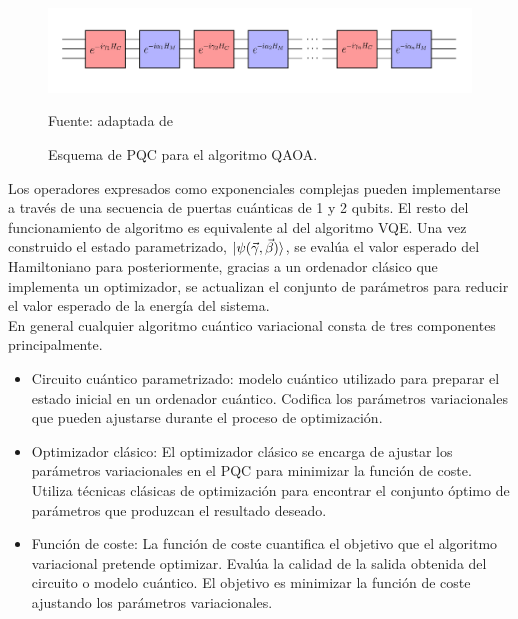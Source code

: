 \begin{figure}[!ht]
    \centering
    \includegraphics[scale = 0.4]{img/03-qaoa_layers.png}
    \caption{Esquema de PQC para el algoritmo QAOA.}
    Fuente: adaptada de \citep{jack}
    \label{fig:qaoa_layers}
\end{figure}

Los operadores expresados como exponenciales complejas pueden implementarse a través de una secuencia de puertas cuánticas de 1 y 2 qubits. El resto del funcionamiento de algoritmo es equivalente al del algoritmo VQE. Una vez construido el estado parametrizado, $\ket{\psi(\Vec{\gamma}, \Vec{\beta})}$, se evalúa el valor esperado del Hamiltoniano para posteriormente, gracias a un ordenador clásico que implementa un optimizador, se actualizan el conjunto de parámetros para reducir el valor esperado de la energía del sistema. \\

En general cualquier algoritmo cuántico variacional consta de tres componentes principalmente. 

\begin{itemize}
    
    \item Circuito cuántico parametrizado: modelo cuántico utilizado para preparar el estado inicial en un ordenador cuántico. Codifica los parámetros variacionales que pueden ajustarse durante el proceso de optimización.

    \item Optimizador clásico: El optimizador clásico se encarga de ajustar los parámetros variacionales en el PQC para minimizar la función de coste. Utiliza técnicas clásicas de optimización para encontrar el conjunto óptimo de parámetros que produzcan el resultado deseado.

    \item Función de coste: La función de coste cuantifica el objetivo que el algoritmo variacional pretende optimizar. Evalúa la calidad de la salida obtenida del circuito o modelo cuántico. El objetivo es minimizar la función de coste ajustando los parámetros variacionales.
    
\end{itemize}

